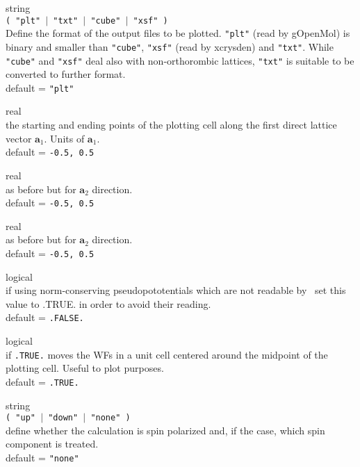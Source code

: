 {\noindent{}%
{\sc string} \\ {\tt ( "plt" $\mid$ "txt" $\mid$ "cube" $\mid$ "xsf" ) }\\
              Define the format of the output files to be plotted.
              {\tt "plt"} (read by {\sc gOpenMol}) is binary and smaller than
              {\tt "cube"}, {\tt "xsf"} (read by {\sc xcrysden}) and
              {\tt "txt"}. While {\tt "cube"} and {\tt "xsf"} deal also
              with non-orthorombic lattices, {\tt "txt"} is suitable to be converted
              to further format.\\
              {\sc default} = {\tt "plt"} \par

\noindent{}%
{\sc real} \\ the starting and ending points of the plotting cell along the
              first direct lattice vector $\mathbf{a}_1$.
              Units of $\mathbf{a}_1$.\\
              {\sc default} = {\tt -0.5, 0.5} \par

\noindent{}%
{\sc real} \\ as before but for $\mathbf{a}_2$ direction.\\
              {\sc default} = {\tt -0.5, 0.5} \par

\noindent{}%
{\sc real} \\ as before but for $\mathbf{a}_2$ direction.\\
              {\sc default} = {\tt -0.5, 0.5} \par

\noindent{}%
{\sc logical} \\ if using norm-conserving pseudopototentials which are not readable
               by \WANT\ set this value to .TRUE. in order to avoid their reading.\\
              {\sc default} = {\tt .FALSE.} \par

\noindent{}%
{\sc logical} \\ if {\tt .TRUE.} moves the WFs in a unit cell centered around the
    midpoint of the plotting cell. Useful to plot purposes.\\
              {\sc default} = {\tt .TRUE.} \par

\noindent{}%
{\sc string} \\ {\tt ( "up" $\mid$ "down" $\mid$ "none" ) }\\
              define whether the calculation is spin polarized and, if the case,
              which spin component is treated.\\
              {\sc default} = {\tt "none"} \par
}\bigskip

